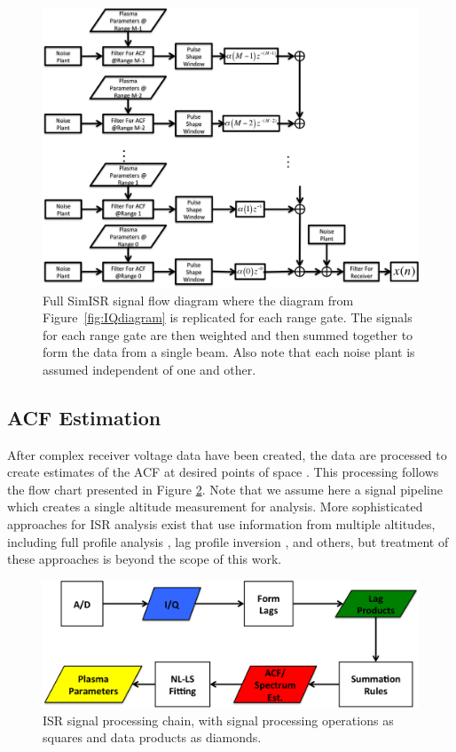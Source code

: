 \documentclass[draft,ras]{agutex}
\begin{document}
\begin{article}
\begin{figure}[!h]
\centering
\includegraphics[width=7.0in]{diagram}
\caption{Full SimISR signal flow diagram where the diagram from Figure~\ref{fig:IQdiagram} is replicated for each range gate. The signals for each range gate are then weighted and then summed together to form the data from a single beam. Also note that each noise plant is assumed independent of one and other.}
\label{fig:isrdiag}
\end{figure}

\subsection{ACF Estimation}
\label{sec:acf}
After complex receiver voltage data have been created, the data are processed to create estimates of the ACF at desired points of space \citep[see, e.g.,][]{farley1969,nygren1996}. This processing follows the flow chart presented in Figure \ref{fig:chain}.  Note that we assume here a signal pipeline which creates a single altitude measurement for analysis.  More sophisticated approaches for ISR analysis exist that use information from multiple altitudes, including full profile analysis \citep{RDS:RDS3308}, lag profile inversion \citep{Virtanen:20082vx}, and others, but treatment of these approaches is beyond the scope of this work.

\begin{figure}[!t]
\centering
\includegraphics[width=6in]{datastackchain}
\caption{ISR signal processing chain, with signal processing operations as squares and data products as diamonds.}
\label{fig:chain}
\end{figure}



\end{article}
\end{document}
